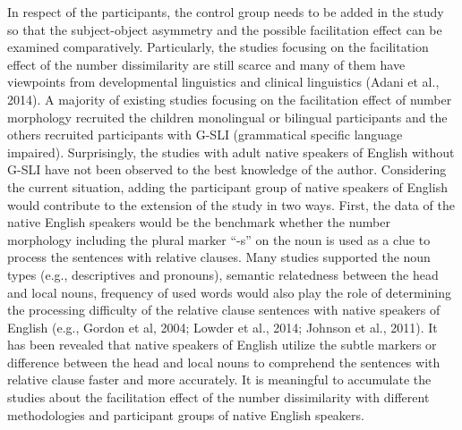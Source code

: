 \documentclass[
]{article}
\begin{document}
In respect of the participants, the control group needs to be added in
the study so that the subject-object asymmetry and the possible
facilitation effect can be examined comparatively. Particularly, the
studies focusing on the facilitation effect of the number dissimilarity
are still scarce and many of them have viewpoints from developmental
linguistics and clinical linguistics (Adani et al., 2014). A majority of
existing studies focusing on the facilitation effect of number
morphology recruited the children monolingual or bilingual participants
and the others recruited participants with G-SLI (grammatical specific
language impaired). Surprisingly, the studies with adult native speakers
of English without G-SLI have not been observed to the best knowledge of
the author. Considering the current situation, adding the participant
group of native speakers of English would contribute to the extension of
the study in two ways. First, the data of the native English speakers
would be the benchmark whether the number morphology including the
plural marker ``-s'' on the noun is used as a clue to process the
sentences with relative clauses. Many studies supported the noun types
(e.g., descriptives and pronouns), semantic relatedness between the head
and local nouns, frequency of used words would also play the role of
determining the processing difficulty of the relative clause sentences
with native speakers of English (e.g., Gordon et al, 2004; Lowder et
al., 2014; Johnson et al., 2011). It has been revealed that native
speakers of English utilize the subtle markers or difference between the
head and local nouns to comprehend the sentences with relative clause
faster and more accurately. It is meaningful to accumulate the studies
about the facilitation effect of the number dissimilarity with different
methodologies and participant groups of native English speakers.
\end{document}
